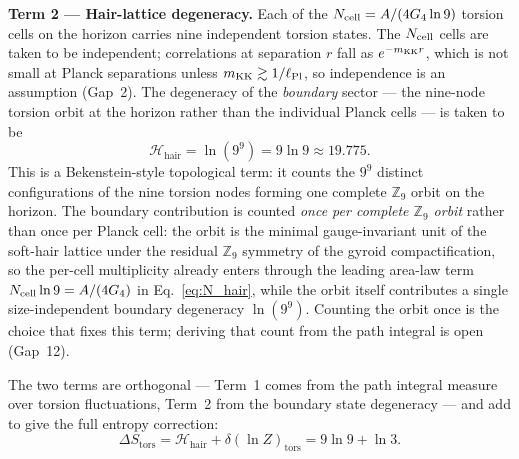 \documentclass[11pt,a4paper]{article}
\begin{document}
\textbf{Term 2 — Hair-lattice degeneracy.}
Each of the $N_{\rm cell} = A/(4G_4\ln 9)$ torsion cells on the horizon
carries nine independent torsion states.  The $N_{\rm cell}$ cells are taken to be
independent; correlations at separation $r$ fall as $e^{-m_{\rm KK} r}$, which is not small at Planck separations unless $m_{\rm KK} \gtrsim 1/\ell_{\rm Pl}$, so independence is an assumption (Gap~2).  The degeneracy of the \emph{boundary}
sector — the nine-node torsion orbit at the horizon rather than the individual
Planck cells — is taken to be
\begin{equation}
  \mathcal{H}_{\mathrm{hair}} = \ln(9^9) = 9\ln 9 \approx 19.775.
  \label{eq:H_hair_sec4}
\end{equation}
This is a Bekenstein-style topological term: it counts the $9^9$
distinct configurations of the nine torsion nodes forming one complete
$\mathbb{Z}_9$ orbit on the horizon.  The boundary contribution is counted
\emph{once per complete $\mathbb{Z}_9$ orbit} rather than once per Planck
cell: the orbit is the minimal gauge-invariant unit of the soft-hair lattice
under the residual $\mathbb{Z}_9$ symmetry of the gyroid compactification, so
the per-cell multiplicity already enters through the leading area-law term
$N_{\rm cell}\ln 9 = A/(4G_4)$ in Eq.~\eqref{eq:N_hair}, while the orbit
itself contributes a single size-independent boundary degeneracy
$\ln(9^9)$.  Counting the orbit once is the choice that fixes this term;
deriving that count from the path integral is open (Gap~12).

The two terms are orthogonal — Term~1 comes from the path integral measure over
torsion fluctuations, Term~2 from the boundary state degeneracy — and add to
give the full entropy correction:
\begin{equation}
  \Delta S_{\mathrm{tors}} = \mathcal{H}_{\mathrm{hair}} + \delta(\ln Z)_{\mathrm{tors}}
    = 9\ln 9 + \ln 3.
  \label{eq:deltaS_tors}
\end{equation}
\end{document}
